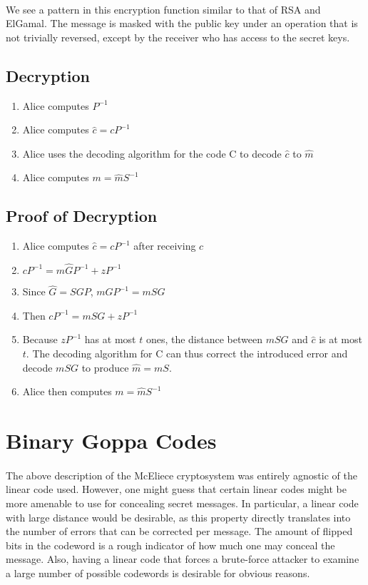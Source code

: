 \documentclass{article}
\theoremstyle{definition}
\begin{document}
	\paragraph{} We see a pattern in this encryption function similar to that of RSA and ElGamal.  The message is masked with the public key under an operation that is not trivially reversed, except by the receiver who has access to the secret keys.
	
	\subsection{Decryption}
	\begin{enumerate}[1)]
	\item Alice computes $P^{-1}$
	\item Alice computes ${\hat c} = cP^{-1}$
	\item Alice uses the decoding algorithm for the code C to decode ${\hat c}$ to ${\hat m}$
	\item Alice computes $m = {\hat m}S^{-1}$
	\end{enumerate}

	\subsection{Proof of Decryption}
	\begin{enumerate}
	\item Alice computes ${\hat c} = cP^{-1}$ after receiving $c$
	\item $cP^{-1} = m{\hat G}P^{-1} + zP^{-1}$
	\item Since ${\hat G} = SGP$, $m{\hat G}P^{-1} = mSG$
	\item Then $cP^{-1} = mSG + zP^{-1}$ 
	\item Because $zP^{-1}$ has at most $t$ ones, the distance between $mSG$ and ${\hat c}$ is at most $t$.  The decoding algorithm for C can thus correct the introduced error and decode $mSG$ to produce ${\hat m} = mS$.
	\item Alice then computes $m = {\hat m}S^{-1}$
	
	
	
	\end{enumerate}

\section{Binary Goppa Codes}
\paragraph{}
The above description of the McEliece cryptosystem was entirely agnostic of the linear code used. However, one might guess that certain linear codes might be more amenable to use for concealing secret messages. In particular, a linear code with large distance would be desirable, as this property directly translates into the number of errors that can be corrected per message. The amount of flipped bits in the codeword is a rough indicator of how much one may conceal the message. Also, having a linear code that forces a brute-force attacker to examine a large number of possible codewords is desirable for obvious reasons. 
\end{document}

